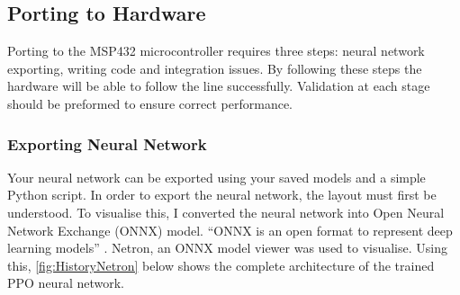 \documentclass[a4paper,12pt]{article}
\begin{document}
\subsection{Porting to Hardware}

Porting to the MSP432 microcontroller requires three steps: neural network exporting, writing code and integration issues. By following these steps the hardware will be able to follow the line successfully. Validation at each stage should be preformed to ensure correct performance.

\subsubsection{Exporting Neural Network}
Your neural network can be exported using your saved models and a simple Python script. In order to export the neural network, the layout must first be understood. To visualise this, I converted the neural network into  Open Neural Network Exchange (ONNX) \cite{exchange2018onnx} model. ``ONNX is an open format to represent deep learning models'' \cite{lin2019onnc}. Netron, an ONNX model viewer was used to visualise. Using this, \autoref{fig:HistoryNetron} below shows the complete architecture of the trained PPO neural network.
\end{document}
